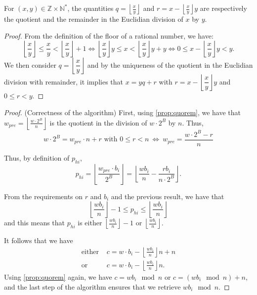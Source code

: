 \documentclass[a4paper]{article}
\begin{document}
\begin{proposition}\label{prop:quorem}
For $(x,y) \in \mathbb{Z}\times \mathbb{N}^*$, the quantities $q=\left\lfloor\frac{x}{y}\right\rfloor$ and 
$r=x - \left\lfloor\frac{x}{y}\right\rfloor y$ are respectively the quotient and the remainder in the Euclidian division of $x$ by $y$.
\end{proposition}
    
\begin{proof}
From the definition of the floor of a rational number, we have:
\[
    \left\lfloor\dfrac{x}{y}\right\rfloor \leq \dfrac{x}{y} < \left\lfloor\dfrac{x}{y}\right\rfloor + 1 \Longleftrightarrow
    \left\lfloor\dfrac{x}{y}\right\rfloor y \leq x < \left\lfloor\dfrac{x}{y}\right\rfloor y + y \Longleftrightarrow
    0 \leq x - \left\lfloor\dfrac{x}{y}\right\rfloor y < y.
\]
We then consider $q=\left\lfloor\dfrac{x}{y}\right\rfloor$ and by the uniqueness of the quotient in the Euclidian division with remainder, 
it implies that $x = yq + r$ with $r=x - \left\lfloor\dfrac{x}{y}\right\rfloor y$ and $0 \leq r < y$.
\end{proof}

\begin{proof} (Correctness of the algorithm)
First, using \autoref{prop:quorem}, we have that $w_{pre}= \left\lfloor\frac{w\cdot 2^B}{n}\right\rfloor $ is the quotient in the division 
of $w\cdot 2^B$ by $n$. Thus,
\[
    w\cdot 2^B = w_{pre}\cdot n + r \text{ with } 0 \leq r < n\ \Longleftrightarrow\ w_{pre} = \dfrac{w\cdot 2^B - r}{n}
\]

Thus, by definition of $p_{hi}$,
\[
p_{hi} = \left\lfloor\frac{w_{pre}\cdot b_i}{2^B}\right\rfloor
= \left\lfloor\dfrac{wb_i}{n} - \dfrac{rb_i}{n\cdot 2^B} \right\rfloor.
\]

From the requirements on $r$ and $b_i$ and the previous result, we have that
\[
\left\lfloor\dfrac{wb_i}{n}\right\rfloor - 1 \leq p_{hi} \leq \left\lfloor\dfrac{wb_i}{n}\right\rfloor
\]
and this means that $p_{hi}$ is either $\left\lfloor\frac{wb_i}{n}\right\rfloor - 1$ or $\left\lfloor\frac{wb_i}{n}\right\rfloor$.


It follows that we have
\begin{align*}
\text{either } &c=w\cdot b_i - \left\lfloor\frac{wb_i}{n}\right\rfloor n + n \\
\text{or } &c=w\cdot b_i - \left\lfloor\frac{wb_i}{n}\right\rfloor n.
\end{align*}
Using \autoref{prop:quorem} again, we have $c=wb_i \mod n$ or $c=(wb_i \mod n)+n$, and the last step of the algorithm ensures 
that we retrieve $wb_i \mod n$.
\end{proof}
\end{document}
